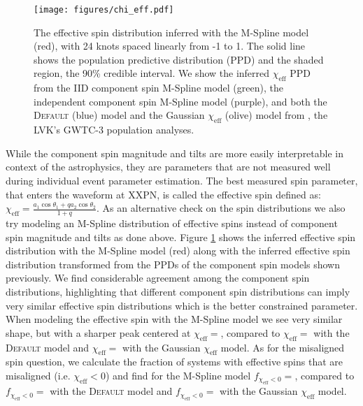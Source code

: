 \begin{figure} 
    \begin{centering}
        \texttt{[image: figures/chi\_eff.pdf]}
        \caption{The effective spin distribution inferred with the M-Spline model (red), with 24 knots spaced linearly from -1 to 1. 
        The solid line shows the population predictive distribution (PPD) and the shaded region, the 90\% credible interval. We show the inferred $\chi_\mathrm{eff}$ 
        PPD from the IID component spin M-Spline model (green), the independent component spin M-Spline model (purple), 
        and both the \textsc{Default} (blue) model and the Gaussian $\chi_\mathrm{eff}$ (olive) model from \citet{o3b_astro_dist}, the LVK's GWTC-3 population analyses.}
        \label{fig:chieff_dist}
    \end{centering}
\end{figure}

While the component spin magnitude and tilts are more easily interpretable in context of the astrophysics, they are parameters that 
are not measured well during individual event parameter estimation. The best measured spin parameter, that enters the waveform at XXPN, is 
called the effective spin defined as: $\chi_\mathrm{eff} = \frac{a_1\cos{\theta_1} + qa_2\cos{\theta_2}}{1+q}$. As an alternative check 
on the spin distributions we also try modeling an M-Spline distribution of effective spins instead of component spin magnitude and tilts 
as done above. Figure \ref{fig:chieff_dist} shows the inferred effective spin distribution with the M-Spline model (red) along with the 
inferred effective spin distribution transformed from the PPDs of the component spin models shown previously. We find considerable agreement 
among the component spin distributions, highlighting that different component spin distributions can imply very similar effective spin 
distributions which is the better constrained parameter. When modeling the effective spin with the M-Spline model we see very similar 
shape, but with a sharper peak centered at $\chi_\mathrm{eff}=$\result{$\CIPlusMinus{\macros[ChiEffective][chieff][PeakChiEff]}$}, compared to 
$\chi_\mathrm{eff}=$\result{$\CIPlusMinus{\macros[ChiEffective][default][PeakChiEff]}$} with the \textsc{Default} model and 
$\chi_\mathrm{eff}=$\result{$\CIPlusMinus{\macros[ChiEffective][gaussian][PeakChiEff]}$} with the Gaussian $\chi_\mathrm{eff}$ model. 
As for the misaligned spin question, we calculate the fraction of systems with effective spins that are misaligned (i.e. $\chi_\mathrm{eff}<0$) and 
find for the M-Spline model $f_{\chi_\mathrm{eff}<0}=$\result{$\CIPlusMinus{\macros[ChiEffective][chieff][FracBelow0]}$}, compared to 
$f_{\chi_\mathrm{eff}<0}=$\result{$\CIPlusMinus{\macros[ChiEffective][default][FracBelow0]}$} with the \textsc{Default} model and 
$f_{\chi_\mathrm{eff}<0}=$\result{$\CIPlusMinus{\macros[ChiEffective][gaussian][FracBelow0]}$} with the Gaussian $\chi_\mathrm{eff}$ model.
